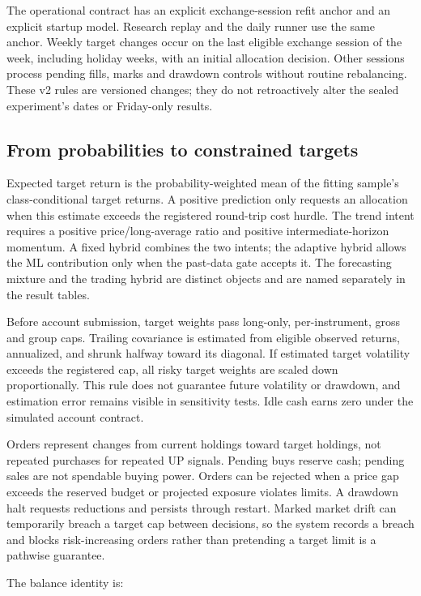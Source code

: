 The operational contract has an explicit exchange-session refit anchor and an explicit startup model. Research replay and the daily runner use the same anchor. Weekly target changes occur on the last eligible exchange session of the week, including holiday weeks, with an initial allocation decision. Other sessions process pending fills, marks and drawdown controls without routine rebalancing. These v2 rules are versioned changes; they do not retroactively alter the sealed experiment's dates or Friday-only results.

\subsection{From probabilities to constrained targets}

Expected target return is the probability-weighted mean of the fitting sample's class-conditional target returns. A positive prediction only requests an allocation when this estimate exceeds the registered round-trip cost hurdle. The trend intent requires a positive price/long-average ratio and positive intermediate-horizon momentum. A fixed hybrid combines the two intents; the adaptive hybrid allows the ML contribution only when the past-data gate accepts it. The forecasting mixture and the trading hybrid are distinct objects and are named separately in the result tables.

Before account submission, target weights pass long-only, per-instrument, gross and group caps. Trailing covariance is estimated from eligible observed returns, annualized, and shrunk halfway toward its diagonal. If estimated target volatility exceeds the registered cap, all risky target weights are scaled down proportionally. This rule does not guarantee future volatility or drawdown, and estimation error remains visible in sensitivity tests. Idle cash earns zero under the simulated account contract.

Orders represent changes from current holdings toward target holdings, not repeated purchases for repeated UP signals. Pending buys reserve cash; pending sales are not spendable buying power. Orders can be rejected when a price gap exceeds the reserved budget or projected exposure violates limits. A drawdown halt requests reductions and persists through restart. Marked market drift can temporarily breach a target cap between decisions, so the system records a breach and blocks risk-increasing orders rather than pretending a target limit is a pathwise guarantee.

The balance identity is:

